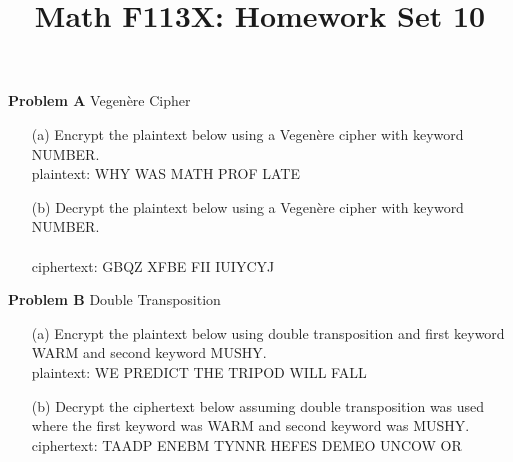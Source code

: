 \documentclass[11pt, oneside]{article}   	%
\title{Math F113X: Homework Set 10}
\date{}							%
\begin{document}
\maketitle

\vspace{-1.5cm}



\textbf{Problem A} Vegen\`{e}re Cipher
	\begin{enumerate}
	\item[(a)] Encrypt the plaintext below using a Vegen\`{e}re cipher with keyword NUMBER.\\
	plaintext: WHY WAS MATH PROF LATE\\
	\item[(b)] Decrypt the plaintext below using a Vegen\`{e}re cipher with keyword NUMBER.\\\\
	ciphertext: GBQZ XFBE FII IUIYCYJ \\
	\end{enumerate}

\textbf{Problem B} Double Transposition
	\begin{enumerate}
	\item[(a)] Encrypt the plaintext below using double transposition and first keyword WARM and second keyword MUSHY.\\
	plaintext: WE PREDICT THE TRIPOD WILL FALL\\
	\item[(b)] Decrypt the ciphertext below assuming double transposition was used where the first keyword was WARM and second keyword was MUSHY.\\
	ciphertext:  TAADP ENEBM TYNNR HEFES DEMEO UNCOW OR\\
	\end{enumerate}
\vfill
\hrulefill
\end{document}
